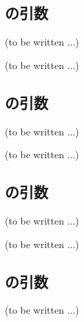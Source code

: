 \subsection{\KIncut の引数\TBW}
(to be written ...)



\clearpage
(to be written ...)


\subsection{\DLone の引数\TBW}
(to be written ...)



\clearpage
(to be written ...)


\subsection{\OwarmingupA の引数\TBW}
(to be written ...)



\clearpage
(to be written ...)


\subsection{\OtoolLengthA の引数\TBW}
(to be written ...)
